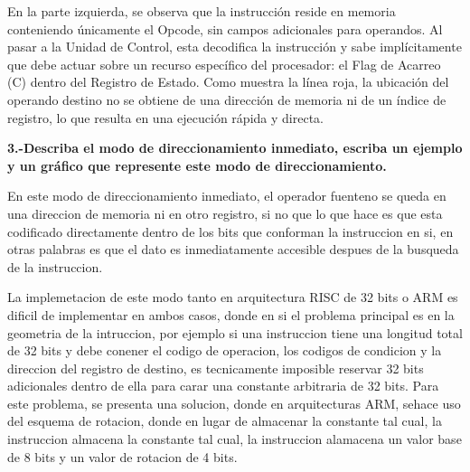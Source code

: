 \documentclass[letterpaper,12pt]{article}
\begin{document}

    En la parte izquierda, se observa que la instrucción reside en memoria conteniendo únicamente el Opcode, sin campos adicionales para operandos. Al pasar a la Unidad de Control, esta decodifica la instrucción y sabe implícitamente que debe actuar sobre un recurso específico del procesador: el Flag de Acarreo (C) dentro del Registro de Estado. Como muestra la línea roja, la ubicación del operando destino no se obtiene de una dirección de memoria ni de un índice de registro, lo que resulta en una ejecución rápida y directa.

    \noindent\textbf{3.-Describa el modo de direccionamiento inmediato, escriba un ejemplo y un gráfico que represente este modo de direccionamiento.}

    En este modo de direccionamiento inmediato, el operador fuenteno se queda en una direccion de memoria ni en otro registro, si no que lo que hace es que esta codificado directamente dentro de los bits que conforman la instruccion en si, en otras palabras es que el dato es inmediatamente accesible despues de la busqueda de la instruccion.
    
    La implemetacion de este modo tanto en arquitectura RISC de 32 bits o ARM es dificil de implementar en ambos casos, donde en si el problema principal es en la geometria de la intruccion, por ejemplo si una instruccion tiene una longitud total de 32 bits y debe conener el codigo de operacion, los codigos de condicion y la direccion del registro de destino, es tecnicamente imposible reservar 32 bits adicionales dentro de ella para carar una constante arbitraria de 32 bits.
    Para este problema, se presenta una solucion, donde en arquitecturas ARM, sehace uso del esquema de rotacion, donde en lugar de almacenar la constante tal cual, la instruccion almacena la constante tal cual, la instruccion alamacena un valor base de 8 bits y un valor de rotacion de 4 bits.
\end{document}
